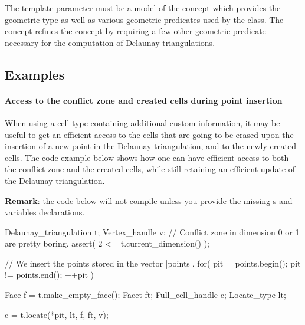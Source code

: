 {{The template parameter  must be a model of the concept
 which provides the geometric  type as
well as various geometric predicates used by the  class.
The concept  refines the concept
 by requiring a few other geometric predicate necessary
for the computation of Delaunay triangulations.


\subsection{Examples}

\paragraph{Access to the conflict zone and created cells during point
insertion}

When using a cell type containing additional custom information, it may be
useful to get an efficient access to the cells that are going to be erased
upon the insertion of a new point in the Delaunay triangulation, and to the newly
created cells. The code example below shows how one can have efficient
access to both the conflict zone and the created cells, while still
retaining an efficient update of the Delaunay triangulation.

\textbf{Remark}: the code below will not compile unless you provide the
missing s and variables declarations.

\begin{ccExampleCode}
Delaunay_triangulation t;
Vertex_handle v;
// Conflict zone in dimension 0 or 1 are pretty boring.
assert( 2 <= t.current_dimension() );

// We insert the points stored in the vector |points|.
for( pit = points.begin(); pit != points.end(); ++pit )
{
    Face             f = t.make_empty_face();
    Facet            ft;
    Full_cell_handle c;
    Locate_type      lt;

    c = t.locate(*pit, lt, f, ft, v);

}
\end{ccExampleCode}}}
